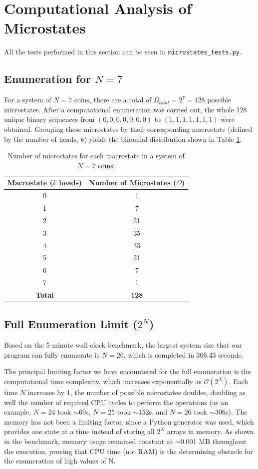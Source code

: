 \documentclass[11pt, a4paper]{article}
\begin{document}
\section{Computational Analysis of Microstates}
All the tests performed in this section can be seen in \texttt{microstates\_tests.py}.

\subsection{Enumeration for $N=7$}
For a system of $N=7$ coins, there are a total of $\Omega_{total} = 2^7 = 128$ possible microstates. After a computational enumeration was carried out, the whole 128 unique binary sequences from $(0, 0, 0, 0, 0, 0, 0)$ to $(1, 1, 1, 1, 1, 1, 1)$ were obtained. Grouping these microstates by their corresponding macrostate (defined by the number of heads, $k$) yields the binomial distribution shown in Table \ref{tab:n7_macrostates}.

\begin{table}[H]
    \centering
    \begin{tabular}{cc}
        \hline
        \textbf{Macrostate ($k$ heads)} & \textbf{Number of Microstates ($\Omega$)} \\
        \hline
        0 & 1 \\
        1 & 7 \\
        2 & 21 \\
        3 & 35 \\
        4 & 35 \\
        5 & 21 \\
        6 & 7 \\
        7 & 1 \\
        \hline
        \textbf{Total} & \textbf{128} \\
        \hline
    \end{tabular}
    \caption{Number of microstates for each macrostate in a system of $N=7$ coins.}
    \label{tab:n7_macrostates}
\end{table}

\subsection{Full Enumeration Limit ($2^{N}$)}
Based on the 5-minute wall-clock benchmark, the largest system size that our program can fully enumerate is \textbf{$N = 26$}, which is completed in 306.43 seconds.

The principal limiting factor we have encountered for the full enumeration is the computational time complexity, which increases exponentially as $\mathcal{O}(2^N)$. Each time $N$ increases by 1, the number of possible microstates doubles, doubling as well the number of required CPU cycles to perform the operations (as an example, $N=24$ took $\sim$69s, $N=25$ took $\sim$152s, and $N=26$ took $\sim$306s). The memory has not been a limiting factor, since a Python generator was used, which provides one state at a time instead of storing all $2^N$ arrays in memory. As shown in the benchmark, memory usage remained  constant at $\sim$0.001 MB throughout the execution, proving that CPU time (not RAM) is the determining obstacle for the enumeration of high values of N.
\end{document}

